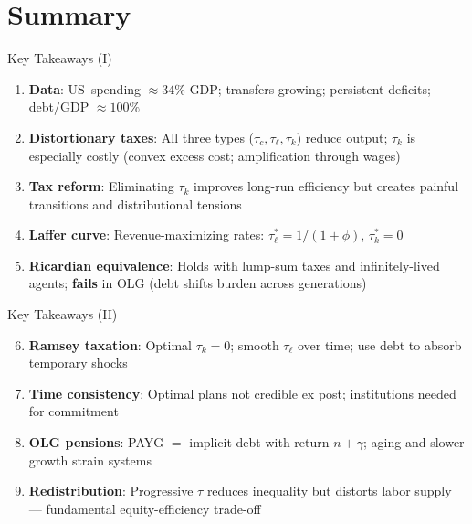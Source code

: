 \documentclass[blue]{beamer}
\begin{document}
\section{Summary}

\begin{frame}{Key Takeaways (I)}
	\begin{enumerate}
		\item \textbf{Data}: US\ spending $\approx 34\%$ GDP; transfers growing; persistent deficits; debt/GDP $\approx 100\%$
		
		\item \textbf{Distortionary taxes}: All three types ($\tau_c, \tau_\ell, \tau_k$) reduce output; $\tau_k$ is especially costly (convex excess cost; amplification through wages)
		
		\item \textbf{Tax reform}: Eliminating $\tau_k$ improves long-run efficiency but creates painful transitions and distributional tensions
		
		\item \textbf{Laffer curve}: Revenue-maximizing rates: $\tau_\ell^* = 1/(1+\phi)$, $\tau_k^* = 0$
		
		\item \textbf{Ricardian equivalence}: Holds with lump-sum taxes and infinitely-lived agents; \textbf{fails} in OLG (debt shifts burden across generations)
	\end{enumerate}
\end{frame}

\begin{frame}{Key Takeaways (II)}
	\begin{enumerate}
		\setcounter{enumi}{5}
		\item \textbf{Ramsey taxation}: Optimal $\tau_k = 0$; smooth $\tau_\ell$ over time; use debt to absorb temporary shocks
		
		\item \textbf{Time consistency}: Optimal plans not credible ex post; institutions needed for commitment
		
		\item \textbf{OLG pensions}: PAYG $=$ implicit debt with return $n+\gamma$; aging and slower growth strain systems
		
		\item \textbf{Redistribution}: Progressive $\tau$ reduces inequality but distorts labor supply --- fundamental equity-efficiency trade-off
	\end{enumerate}
\end{frame}
\end{document}
